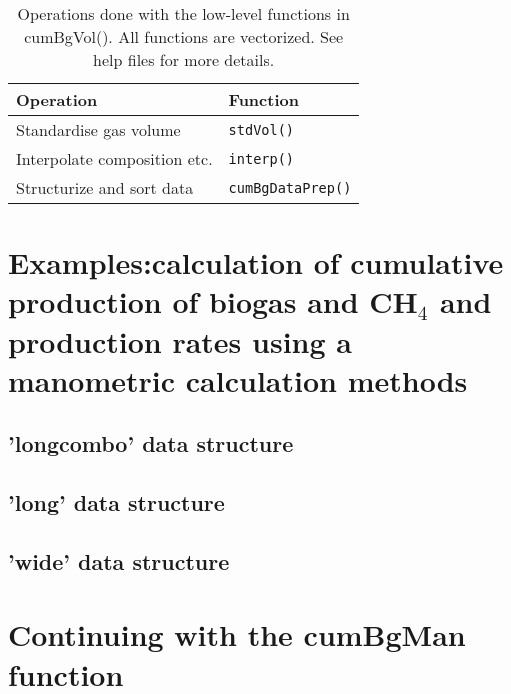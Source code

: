 \documentclass{article}
\begin{document}
\begin{table}[h!]
  \begin{center}
  \caption{Operations done with the low-level functions in cumBgVol(). All functions are vectorized. See help files for more details.}
  \label{tab:lowfunctionsummary}
  \vspace{3pt}
  
  \begin{tabular}{ll}
    \hline
    Operation                                    &   Function \\
    \hline
    Standardise gas volume                       &   \texttt{stdVol()} \\
    Interpolate composition etc.                 &   \texttt{interp()} \\
    Structurize and sort data                    &   \texttt{cumBgDataPrep()} \\   
		\hline
  \end{tabular}
  \end{center}
\end{table}


\section{Examples:calculation of cumulative production of biogas and CH$_4$ and production rates using a manometric calculation methods}
\subsection{'longcombo' data structure}

\newpage
\subsection{'long' data structure}

\newpage
\subsection{'wide' data structure}






\newpage





\section{Continuing with the cumBgMan function}
 
\end{document}

